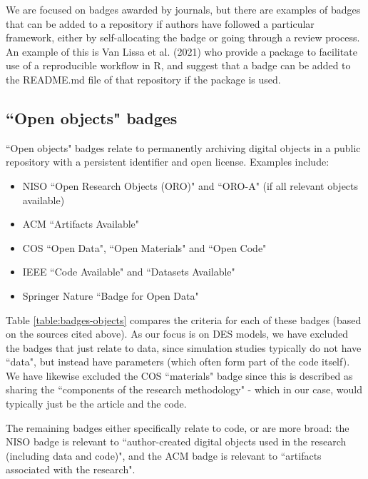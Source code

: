 We are focused on badges awarded by journals, but there are examples of badges that can be added to a repository if authors have followed a particular framework, either by self-allocating the badge or going through a review process. An example of this is Van Lissa et al. (2021)\autocite{van_lissa_worcs_2021} who provide a package to facilitate use of a reproducible workflow in R, and suggest that a badge can be added to the README.md file of that repository if the package is used.\autocite{van_lissa_worcs_2021}

\newpage
\subsection{``Open objects" badges}

``Open objects" badges relate to permanently archiving digital objects in a public repository with a persistent identifier and open license.\autocite{niso_reproducibility_badging_and_definitions_working_group_reproducibility_2021} Examples include:
\begin{itemize}
    \item NISO ``Open Research Objects (ORO)" and ``ORO-A" (if all relevant objects available)\autocite{niso_reproducibility_badging_and_definitions_working_group_reproducibility_2021}
    \item ACM ``Artifacts Available"\autocite{association_for_computing_machinery_acm_artifact_2020}
    \item COS ``Open Data", ``Open Materials" and ``Open Code"\autocite{blohowiak_badges_2023}
    \item IEEE ``Code Available" and ``Datasets Available"\autocite{institute_of_electrical_and_electronics_engineers_ieee_about_nodate}
    \item Springer Nature ``Badge for Open Data"\autocite{springer_nature_springer_2018}
\end{itemize}

Table \ref{table:badges-objects} compares the criteria for each of these badges (based on the sources cited above). As our focus is on DES models, we have excluded the badges that just relate to data, since simulation studies typically do not have ``data", but instead have parameters (which often form part of the code itself). We have likewise excluded the COS ``materials" badge since this is described as sharing the ``components of the research methodology" - which in our case, would typically just be the article and the code.

The remaining badges either specifically relate to code, or are more broad: the NISO badge is relevant to ``author-created digital objects used in the research (including data and code)",\autocite{niso_reproducibility_badging_and_definitions_working_group_reproducibility_2021} and the ACM badge is relevant to ``artifacts associated with the research".\autocite{association_for_computing_machinery_acm_artifact_2020}

